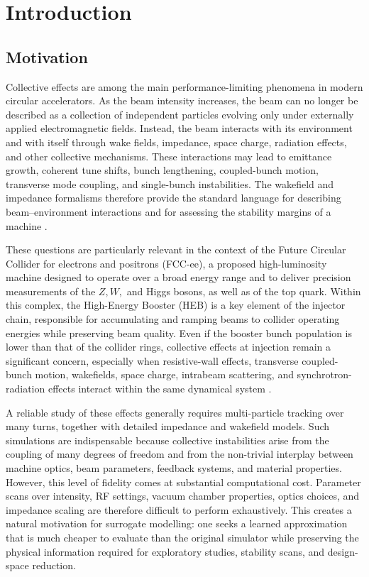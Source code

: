 
\chapter{Introduction}
\label{sec:01_introduction_introduction}

\section{Motivation}
\label{sec:01_introduction_motivation}

Collective effects are among the main performance-limiting phenomena in modern circular accelerators. As the beam intensity increases, the beam can no longer be described as a collection of independent particles evolving only under externally applied electromagnetic fields. Instead, the beam interacts with its environment and with itself through wake fields, impedance, space charge, radiation effects, and other collective mechanisms. These interactions may lead to emittance growth, coherent tune shifts, bunch lengthening, coupled-bunch motion, transverse mode coupling, and single-bunch instabilities. The wakefield and impedance formalisms therefore provide the standard language for describing beam–environment interactions and for assessing the stability margins of a machine \cite{metral2021wake}.

These questions are particularly relevant in the context of the Future Circular Collider for electrons and positrons (FCC-ee), a proposed high-luminosity machine designed to operate over a broad energy range and to deliver precision measurements of the \(Z , W ,\) and Higgs bosons, as well as of the top quark. Within this complex, the High-Energy Booster (HEB) is a key element of the injector chain, responsible for accumulating and ramping beams to collider operating energies while preserving beam quality. Even if the booster bunch population is lower than that of the collider rings, collective effects at injection remain a significant concern, especially when resistive-wall effects, transverse coupled-bunch motion, wakefields, space charge, intrabeam scattering, and synchrotron-radiation effects interact within the same dynamical system \cite{ghribi2026collective}.

A reliable study of these effects generally requires multi-particle tracking over many turns, together with detailed impedance and wakefield models. Such simulations are indispensable because collective instabilities arise from the coupling of many degrees of freedom and from the non-trivial interplay between machine optics, beam parameters, feedback systems, and material properties. However, this level of fidelity comes at substantial computational cost. Parameter scans over intensity, RF settings, vacuum chamber properties, optics choices, and impedance scaling are therefore difficult to perform exhaustively. This creates a natural motivation for surrogate modelling: one seeks a learned approximation that is much cheaper to evaluate than the original simulator while preserving the physical information required for exploratory studies, stability scans, and design-space reduction.

